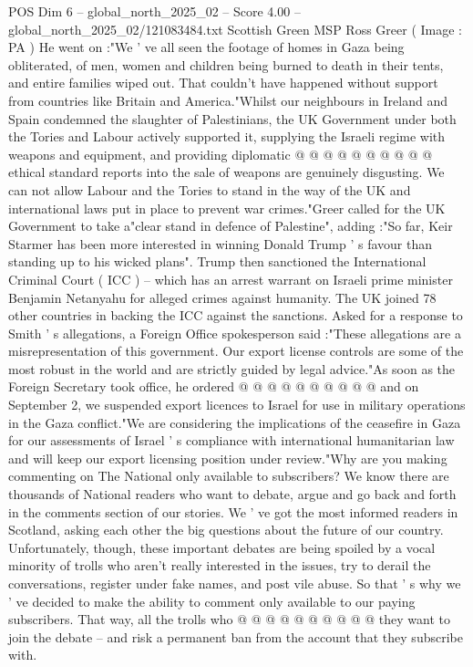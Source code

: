 \begin{textsample}{POS Dim 6 – global\_north\_2025\_02 – Score 4.00 – global\_north\_2025\_02/121083484.txt}
Scottish Green MSP Ross Greer ( Image : PA ) He went on :"We ' ve all seen the footage of homes in Gaza being obliterated, of men, women and children being burned to death in their tents, and entire families wiped out.
That couldn't have happened without support from countries like Britain and America."Whilst our neighbours in Ireland and Spain condemned the slaughter of Palestinians, the UK Government under both the Tories and Labour actively supported it, supplying the Israeli regime with weapons and equipment, and providing diplomatic @ @ @ @ @ @ @ @ @ @ ethical standard reports into the sale of weapons are genuinely disgusting.
We can not allow Labour and the Tories to stand in the way of the UK and international laws put in place to prevent war crimes."Greer called for the UK Government to take a"clear stand in defence of Palestine", adding :"So far, Keir Starmer has been more interested in winning Donald Trump ' s favour than standing up to his wicked plans".
Trump then sanctioned the International Criminal Court ( ICC ) -- which has an arrest warrant on Israeli prime minister Benjamin Netanyahu for alleged crimes against humanity.
The UK joined 78 other countries in backing the ICC against the sanctions.
Asked for a response to Smith ' s allegations, a Foreign Office spokesperson said :"These allegations are a misrepresentation of this government.
Our export license controls are some of the most robust in the world and are strictly guided by legal advice."As soon as the Foreign Secretary took office, he ordered @ @ @ @ @ @ @ @ @ @ and on September 2, we suspended export licences to Israel for use in military operations in the Gaza conflict."We are considering the implications of the ceasefire in Gaza for our assessments of Israel ' s compliance with international humanitarian law and will keep our export licensing position under review."Why are you making commenting on The National only available to subscribers?
We know there are thousands of National readers who want to debate, argue and go back and forth in the comments section of our stories.
We ' ve got the most informed readers in Scotland, asking each other the big questions about the future of our country.
Unfortunately, though, these important debates are being spoiled by a vocal minority of trolls who aren't really interested in the issues, try to derail the conversations, register under fake names, and post vile abuse.
So that ' s why we ' ve decided to make the ability to comment only available to our paying subscribers.
That way, all the trolls who @ @ @ @ @ @ @ @ @ @ they want to join the debate -- and risk a permanent ban from the account that they subscribe with.

\end{textsample}
